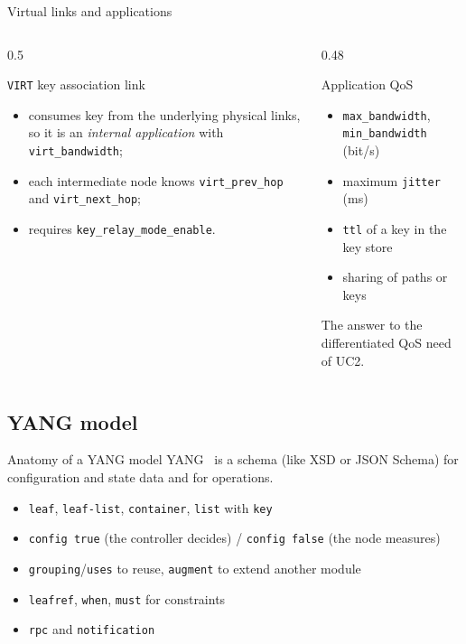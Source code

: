 \documentclass[10pt]{beamer}
\begin{document}
\begin{frame}{Virtual links and applications}
  \begin{columns}[T]
    \begin{column}{0.5\textwidth}
      \begin{block}{\texttt{VIRT} key association link}
        \begin{itemize}
          \item consumes key from the underlying physical links, so it is
                an \emph{internal application} with
                \texttt{virt\_bandwidth};
          \item each intermediate node knows
                \texttt{virt\_prev\_hop} and \texttt{virt\_next\_hop};
          \item requires \texttt{key\_relay\_mode\_enable}.
        \end{itemize}
      \end{block}
    \end{column}
    \begin{column}{0.48\textwidth}
      \begin{block}{Application QoS}
        \begin{itemize}
          \item \texttt{max\_bandwidth}, \texttt{min\_bandwidth} (bit/s)
          \item maximum \texttt{jitter} (ms)
          \item \texttt{ttl} of a key in the key store
          \item sharing of paths or keys
        \end{itemize}
      \end{block}
      \small The answer to the differentiated QoS need of UC2.
    \end{column}
  \end{columns}
\end{frame}

\subsection{YANG model}

\begin{frame}{Anatomy of a YANG model}
  YANG~\cite{rfc7950} is a \alert{schema} (like XSD or JSON
      Schema) for configuration and state data and for operations.
  \begin{itemize}
        \item \texttt{leaf}, \texttt{leaf-list}, \texttt{container},
              \texttt{list} with \texttt{key}
        \item \texttt{config true} (the controller decides) /
              \texttt{config false} (the node measures)
        \item \texttt{grouping}/\texttt{uses} to reuse,
              \texttt{augment} to extend another module
        \item \texttt{leafref}, \texttt{when}, \texttt{must} for constraints
        \item \texttt{rpc} and \texttt{notification}
      \end{itemize}
\end{frame}
\end{document}
